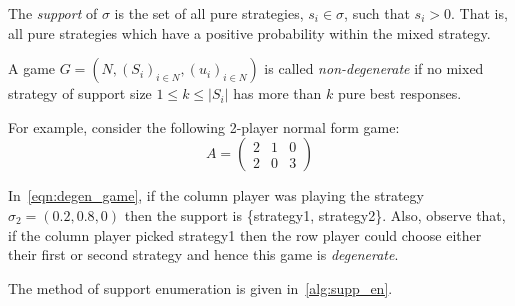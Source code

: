 \begin{definition}
    The \emph{support} of \(\sigma \) is the set of all pure strategies, \(s_{i}
    \in \sigma \), such that \(s_{i} > 0\). That is, all pure strategies which
    have a positive probability within the mixed strategy.
\end{definition}

\begin{definition}
    A game \(G = (N, {(S_{i})}_{i \in N}, {(u_{i})}_{i \in N})\)
    is called \emph{non-degenerate} if no mixed strategy of support size \(1 \le
    k \le |S_{i}|\) has more than \(k\) pure best responses.
\end{definition}\label{def:non_degen}

For example, consider the following 2-player normal form game:
\begin{equation}
        A = \begin{pmatrix}
                2 & 1 & 0\\
                2 & 0 & 3
        \end{pmatrix}
\end{equation}\label{eqn:degen_game}


In~\eqref{eqn:degen_game}, if the column player was playing the strategy \(\sigma_{2} = (0.2, 0.8,
0)\) then the support is \{strategy1, strategy2\}. Also, observe that, if the
column player picked strategy1 then the row player could choose either their
first or second strategy and hence this game is \textit{degenerate}. 

The method of support enumeration is given in~\autoref{alg:supp_en}.

